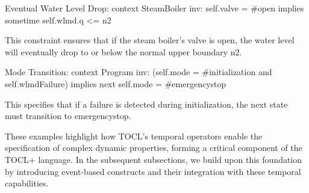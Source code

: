 Eventual Water Level Drop:
context SteamBoiler inv:
  self.valve = \#open implies sometime self.wlmd.q <= n2

This constraint ensures that if the steam boiler's valve is open, the water level will eventually drop to or below the normal upper boundary n2.

Mode Transition:
context Program inv:
  (self.mode = \#initialization and self.wlmdFailure)
  implies next self.mode = \#emergencystop

This specifies that if a failure is detected during initialization, the next state must transition to emergencystop.


These examples highlight how TOCL's temporal operators enable the specification of complex dynamic properties, forming a critical component of the TOCL+ language. In the subsequent subsections, we build upon this foundation by introducing event-based constructs and their integration with these temporal capabilities.